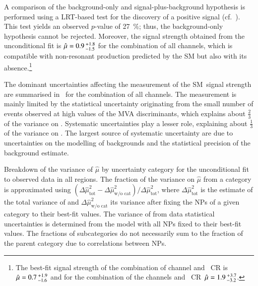 A comparison of the background-only and signal-plus-background hypothesis is
performed using a LRT-based test for the discovery of a positive signal
(cf.~). This test yields an observed $p$-value of
\SI{27}{\percent}; thus, the background-only hypothesis cannot be rejected.
Moreover, the signal strength obtained from the unconditional fit is
$\hat{\mu} = 0.9\,^{\hspace{0.25pt}+\hspace{0.25pt}1.8}_{-1.5}$ for the
combination of all channels, which is compatible with non-resonant \HH
production predicted by the SM but also with its absence.\footnote{The best-fit
  signal strength of the combination of \hadhad channel and \ZHF~CR
  is~$\hat{\mu} = 0.7\,^{\hspace{0.25pt}+\hspace{0.25pt}1.9}_{-1.6}$ and for the
  combination of the \lephad channels and
  \ZHF~CR~$\hat{\mu} = 1.9\,^{\hspace{0.25pt}+\hspace{0.25pt}3.7}_{-3.2}$.}

The dominant uncertainties affecting the measurement of the SM~\HH signal
strength are summarised in~ for the combination of
all channels. The measurement is mainly limited by the statistical uncertainty
originating from the small number of events observed at high values of the MVA
discriminants, which explains about $\frac{2}{3}$ of the variance on
\muhat. Systematic uncertainties play a lesser role, explaining about
$\frac{1}{3}$ of the variance on \muhat. The largest source of systematic
uncertainty are due to uncertainties on the modelling of backgrounds and the
statistical precision of the background estimate.

\begin{table}[htbp]
  \centering

  \caption{Breakdown of the variance of $\hat{\mu}$ by uncertainty category
    for the unconditional fit to observed data in all regions. The fraction of
    the variance on $\hat{\mu}$ from a category is approximated using
    $(\Delta\hat{\mu}^2_{\text{tot}} - \Delta\hat{\mu}^2_{\text{w/o cat}}) /
    \Delta \hat{\mu}^2_{\text{tot}}$, where $\Delta\hat{\mu}^2_{\text{tot}}$ is
    the estimate of the total variance of \muhat and
    $\Delta\hat{\mu}^2_{\text{w/o cat}}$ its variance after fixing the NPs of a
    given category to their best-fit values. The variance of \muhat from data
    statistical uncertainties is determined from the model with all NPs fixed to
    their best-fit values. The fractions of subcategories do not necessarily sum
    to the fraction of the parent category due to correlations between NPs.}%
  \label{tab:breakdown_nonres}

  
\end{table}

